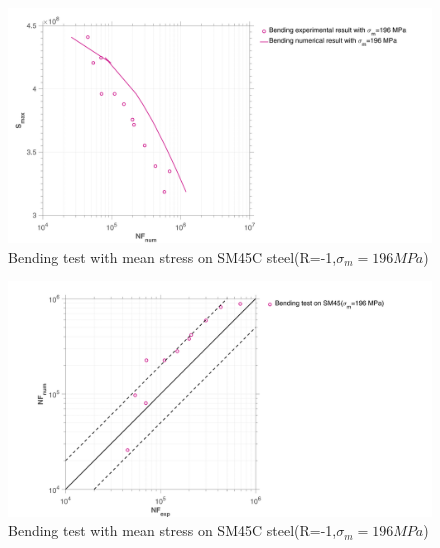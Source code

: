 \documentclass[3p,times,number,review]{elsarticle}
\begin{document}
\begin{figure}[!h]
	\centering
	\includegraphics[width=\textwidth]{figures//b1D_m_SM45C_sn.png} 
	\caption{Bending test with mean stress on SM45C steel(R=-1,$\sigma_m=196 MPa$)}
	\label{fig.b1DmSM45Csn}
\end{figure}
\begin{figure}[!h]
	\centering
	\includegraphics[width=\textwidth]{figures//b1D_m_SM45C_err1.png} 
	\caption{Bending test with mean stress on SM45C steel(R=-1,$\sigma_m=196 MPa$)}
	\label{fig.b1DmSM45Cerr1}
\end{figure}
\end{document}
